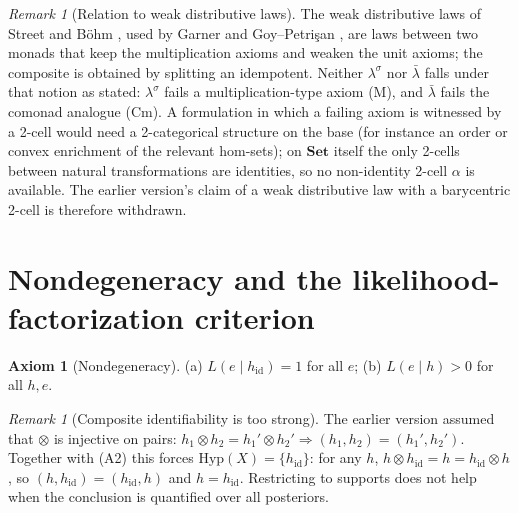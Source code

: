 \documentclass[11pt]{article}
\theoremstyle{definition}
\newtheorem{axiom}[theorem]{Axiom}
\theoremstyle{remark}
\newtheorem{remark}[theorem]{Remark}
\newcommand{\Set}{\mathbf{Set}}
\newcommand{\Hyp}{\mathrm{Hyp}}
\newcommand{\hid}{h_{\mathrm{id}}}
\newcommand{\lb}{\bar\lambda}
\newcommand{\ls}{\lambda^{\sigma}}
\begin{document}
\begin{remark}[Relation to weak distributive laws]\label{rem:weak}
The weak distributive laws of Street and B\"ohm \cite{Street2009,Bohm2010,BohmLackStreet2011}, used by
Garner \cite{Garner2020} and Goy--Petri\c{s}an \cite{GoyPetrisan2020}, are laws between two monads
that keep the multiplication axioms and weaken the unit axioms; the composite is obtained by
splitting an idempotent. Neither $\ls$ nor $\lb$ falls under that notion as stated: $\ls$ fails a
multiplication-type axiom (M), and $\lb$ fails the comonad analogue (Cm). A formulation in which a
failing axiom is witnessed by a 2-cell would need a 2-categorical structure on the base (for instance
an order or convex enrichment of the relevant hom-sets); on $\Set$ itself the only 2-cells between
natural transformations are identities, so no non-identity 2-cell $\alpha$ is available. The earlier
version's claim of a weak distributive law with a barycentric 2-cell is therefore withdrawn.
\end{remark}

\section{Nondegeneracy and the likelihood-factorization criterion}

\begin{axiom}[Nondegeneracy]\label{ax:nondeg}
(a) $L(e\mid\hid)=1$ for all $e$; (b) $L(e\mid h)>0$ for all $h,e$.
\end{axiom}

\begin{remark}[Composite identifiability is too strong]\label{rem:ci}
The earlier version assumed that $\otimes$ is injective on pairs:
$h_1\otimes h_2=h_1'\otimes h_2'\Rightarrow(h_1,h_2)=(h_1',h_2')$. Together with (A2) this forces
$\Hyp(X)=\{\hid\}$: for any $h$, $h\otimes\hid=h=\hid\otimes h$, so $(h,\hid)=(\hid,h)$ and $h=\hid$.
Restricting to supports does not help when the conclusion is quantified over all posteriors.
\end{remark}
\end{document}
